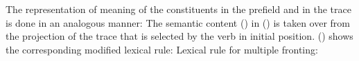 The representation of meaning of the constituents in the prefield and in the trace is done in an analogous manner:
The semantic content () in () is taken over from the projection of the trace that is selected by the verb in
initial position. () shows the corresponding modified lexical
rule:
\eas
\label{lr-mult-vf-zwei}
Lexical rule for multiple fronting:\\
